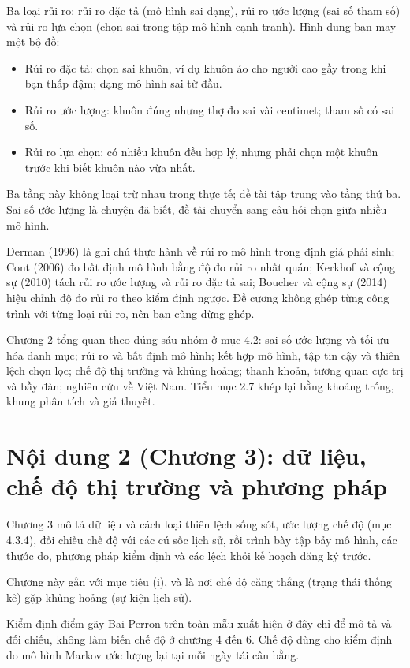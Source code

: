 Ba loại rủi ro: rủi ro đặc tả (mô hình sai dạng), rủi ro ước lượng (sai số tham số) và rủi ro lựa chọn (chọn sai trong tập mô hình cạnh tranh). Hình dung bạn may một bộ đồ:

\begin{itemize}
\item
  Rủi ro đặc tả: chọn sai khuôn, ví dụ khuôn áo cho người cao gầy trong khi bạn thấp đậm; dạng mô hình sai từ đầu.
\item
  Rủi ro ước lượng: khuôn đúng nhưng thợ đo sai vài centimet; tham số có sai số.
\item
  Rủi ro lựa chọn: có nhiều khuôn đều hợp lý, nhưng phải chọn một khuôn trước khi biết khuôn nào vừa nhất.
\end{itemize}

Ba tầng này không loại trừ nhau trong thực tế; đề tài tập trung vào tầng thứ ba. Sai số ước lượng là chuyện đã biết, đề tài chuyển sang câu hỏi chọn giữa nhiều mô hình.

Derman (1996) là ghi chú thực hành về rủi ro mô hình trong định giá phái sinh; Cont (2006) đo bất định mô hình bằng độ đo rủi ro nhất quán; Kerkhof và cộng sự (2010) tách rủi ro ước lượng và rủi ro đặc tả sai; Boucher và cộng sự (2014) hiệu chỉnh độ đo rủi ro theo kiểm định ngược. Đề cương không ghép từng công trình với từng loại rủi ro, nên bạn cũng đừng ghép.

Chương 2 tổng quan theo đúng sáu nhóm ở mục 4.2: sai số ước lượng và tối ưu hóa danh mục; rủi ro và bất định mô hình; kết hợp mô hình, tập tin cậy và thiên lệch chọn lọc; chế độ thị trường và khủng hoảng; thanh khoản, tương quan cực trị và bầy đàn; nghiên cứu về Việt Nam. Tiểu mục 2.7 khép lại bằng khoảng trống, khung phân tích và giả thuyết.

\section{Nội dung 2 (Chương 3): dữ liệu, chế độ thị trường và phương pháp}

Chương 3 mô tả dữ liệu và cách loại thiên lệch sống sót, ước lượng chế độ (mục 4.3.4), đối chiếu chế độ với các cú sốc lịch sử, rồi trình bày tập bảy mô hình, các thước đo, phương pháp kiểm định và các lệch khỏi kế hoạch đăng ký trước.

Chương này gắn với mục tiêu (i), và là nơi chế độ căng thẳng (trạng thái thống kê) gặp khủng hoảng (sự kiện lịch sử).

Kiểm định điểm gãy Bai-Perron trên toàn mẫu xuất hiện ở đây chỉ để mô tả và đối chiếu, không làm biến chế độ ở chương 4 đến 6. Chế độ dùng cho kiểm định do mô hình Markov ước lượng lại tại mỗi ngày tái cân bằng.

